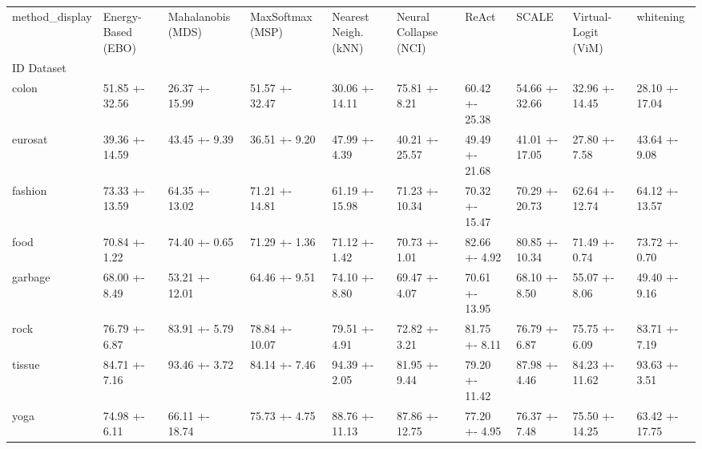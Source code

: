 \begin{tabular}{llllllllll}
\toprule
method_display & Energy-Based (EBO) & Mahalanobis (MDS) & MaxSoftmax (MSP) & Nearest Neigh. (kNN) & Neural Collapse (NCI) & ReAct & SCALE & Virtual-Logit (ViM) & whitening \\
ID Dataset &  &  &  &  &  &  &  &  &  \\
\midrule
colon & 51.85 +- 32.56 & 26.37 +- 15.99 & 51.57 +- 32.47 & 30.06 +- 14.11 & 75.81 +- 8.21 & 60.42 +- 25.38 & 54.66 +- 32.66 & 32.96 +- 14.45 & 28.10 +- 17.04 \\
eurosat & 39.36 +- 14.59 & 43.45 +- 9.39 & 36.51 +- 9.20 & 47.99 +- 4.39 & 40.21 +- 25.57 & 49.49 +- 21.68 & 41.01 +- 17.05 & 27.80 +- 7.58 & 43.64 +- 9.08 \\
fashion & 73.33 +- 13.59 & 64.35 +- 13.02 & 71.21 +- 14.81 & 61.19 +- 15.98 & 71.23 +- 10.34 & 70.32 +- 15.47 & 70.29 +- 20.73 & 62.64 +- 12.74 & 64.12 +- 13.57 \\
food & 70.84 +- 1.22 & 74.40 +- 0.65 & 71.29 +- 1.36 & 71.12 +- 1.42 & 70.73 +- 1.01 & 82.66 +- 4.92 & 80.85 +- 10.34 & 71.49 +- 0.74 & 73.72 +- 0.70 \\
garbage & 68.00 +- 8.49 & 53.21 +- 12.01 & 64.46 +- 9.51 & 74.10 +- 8.80 & 69.47 +- 4.07 & 70.61 +- 13.95 & 68.10 +- 8.50 & 55.07 +- 8.06 & 49.40 +- 9.16 \\
rock & 76.79 +- 6.87 & 83.91 +- 5.79 & 78.84 +- 10.07 & 79.51 +- 4.91 & 72.82 +- 3.21 & 81.75 +- 8.11 & 76.79 +- 6.87 & 75.75 +- 6.09 & 83.71 +- 7.19 \\
tissue & 84.71 +- 7.16 & 93.46 +- 3.72 & 84.14 +- 7.46 & 94.39 +- 2.05 & 81.95 +- 9.44 & 79.20 +- 11.42 & 87.98 +- 4.46 & 84.23 +- 11.62 & 93.63 +- 3.51 \\
yoga & 74.98 +- 6.11 & 66.11 +- 18.74 & 75.73 +- 4.75 & 88.76 +- 11.13 & 87.86 +- 12.75 & 77.20 +- 4.95 & 76.37 +- 7.48 & 75.50 +- 14.25 & 63.42 +- 17.75 \\
\bottomrule
\end{tabular}
